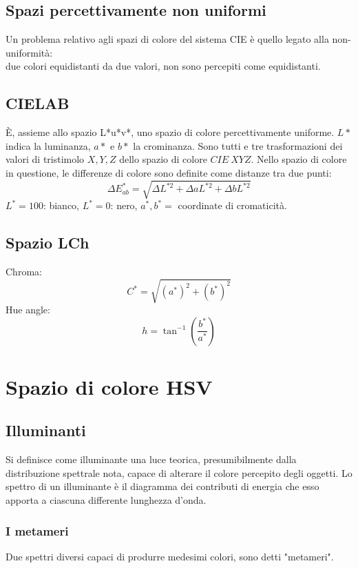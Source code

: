 \documentclass{report}
\begin{document}
	\subsection{Spazi percettivamente non uniformi}
	Un problema relativo agli spazi di colore del sistema CIE è quello legato alla non-uniformità:\\
	due colori equidistanti da due valori, non sono percepiti come equidistanti.
	\subsection{CIELAB}
	È, assieme allo spazio L*u*v*, uno spazio di colore percettivamente uniforme.
	$L*$ indica la luminanza, $a*$ e $b*$ la crominanza.
	Sono tutti e tre trasformazioni dei valori di tristimolo $X,Y,Z$ dello spazio di colore $CIE \ XYZ$.
	Nello spazio di colore in questione, le differenze di colore sono definite come distanze tra due punti:
	$$
	\Delta E^*_{ab} = \sqrt{\Delta L^{*2} + \Delta a L^{*2} + \Delta b L^{*2}}
	$$
	$L^* = 100$: bianco, $L^*=0$: nero, $a^*,b^* =$ coordinate di cromaticità.
	
	\subsection{Spazio LCh}
	Chroma:
	$$C^* = \sqrt{(a^*)^2 + (b^*)^2}$$
	Hue angle:
	$$h = \tan^{-1}(\frac{b^*}{a^*})$$
	\newpage
	\section{Spazio di colore HSV}
	\subsection{Illuminanti}
	Si definisce come illuminante una luce teorica, presumibilmente dalla\\distribuzione spettrale nota, capace di alterare il colore percepito degli oggetti. Lo spettro di un illuminante è il diagramma dei contributi di energia che esso apporta a ciascuna differente lunghezza d'onda.
	\subsubsection{I metameri}
	Due spettri diversi capaci di produrre medesimi colori, sono detti "metameri".
\end{document}
